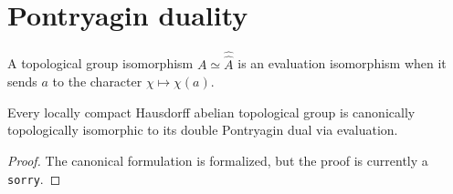 \section{Pontryagin duality}

\begin{definition}
\label{def:pontryagin-evaluation}
\leanok
A topological group isomorphism $A\simeq \widehat{\widehat A}$ is an evaluation isomorphism when it sends $a$ to the character $\chi\mapsto\chi(a)$.
\end{definition}

\begin{theorem}
\label{thm:pontryagin-duality}
\notready
{}
Every locally compact Hausdorff abelian topological group is canonically topologically isomorphic to its double Pontryagin dual via evaluation.
\end{theorem}

\begin{proof}
The canonical formulation is formalized, but the proof is currently a \texttt{sorry}.
\end{proof}
